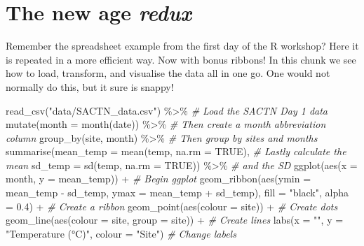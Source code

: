 \documentclass[
]{book}
\newenvironment{Shaded}{\begin{snugshade}}{\end{snugshade}}
\newcommand{\AttributeTok}[1]{\textcolor[rgb]{0.77,0.63,0.00}{#1}}
\newcommand{\CommentTok}[1]{\textcolor[rgb]{0.56,0.35,0.01}{\textit{#1}}}
\newcommand{\ConstantTok}[1]{\textcolor[rgb]{0.00,0.00,0.00}{#1}}
\newcommand{\FloatTok}[1]{\textcolor[rgb]{0.00,0.00,0.81}{#1}}
\newcommand{\FunctionTok}[1]{\textcolor[rgb]{0.00,0.00,0.00}{#1}}
\newcommand{\NormalTok}[1]{#1}
\newcommand{\SpecialCharTok}[1]{\textcolor[rgb]{0.00,0.00,0.00}{#1}}
\newcommand{\StringTok}[1]{\textcolor[rgb]{0.31,0.60,0.02}{#1}}
\begin{document}
\hypertarget{the-new-age-redux}{%
\section{\texorpdfstring{The new age \emph{redux}}{The new age redux}}\label{the-new-age-redux}}

Remember the spreadsheet example from the first day of the R workshop? Here it is repeated in a more efficient way. Now with bonus ribbons! In this chunk we see how to load, transform, and visualise the data all in one go. One would not normally do this, but it sure is snappy!

\begin{Shaded}
\begin{Highlighting}[]
\FunctionTok{read\_csv}\NormalTok{(}\StringTok{"data/SACTN\_data.csv"}\NormalTok{) }\SpecialCharTok{\%\textgreater{}\%} \CommentTok{\# Load the SACTN Day 1 data}
  \FunctionTok{mutate}\NormalTok{(}\AttributeTok{month =} \FunctionTok{month}\NormalTok{(date)) }\SpecialCharTok{\%\textgreater{}\%} \CommentTok{\# Then create a month abbreviation column}
  \FunctionTok{group\_by}\NormalTok{(site, month) }\SpecialCharTok{\%\textgreater{}\%} \CommentTok{\# Then group by sites and months}
  \FunctionTok{summarise}\NormalTok{(}\AttributeTok{mean\_temp =} \FunctionTok{mean}\NormalTok{(temp, }\AttributeTok{na.rm =} \ConstantTok{TRUE}\NormalTok{), }\CommentTok{\# Lastly calculate the mean}
            \AttributeTok{sd\_temp =} \FunctionTok{sd}\NormalTok{(temp, }\AttributeTok{na.rm =} \ConstantTok{TRUE}\NormalTok{)) }\SpecialCharTok{\%\textgreater{}\%} \CommentTok{\# and the SD}
  \FunctionTok{ggplot}\NormalTok{(}\FunctionTok{aes}\NormalTok{(}\AttributeTok{x =}\NormalTok{ month, }\AttributeTok{y =}\NormalTok{ mean\_temp)) }\SpecialCharTok{+} \CommentTok{\# Begin ggplot}
  \FunctionTok{geom\_ribbon}\NormalTok{(}\FunctionTok{aes}\NormalTok{(}\AttributeTok{ymin =}\NormalTok{ mean\_temp }\SpecialCharTok{{-}}\NormalTok{ sd\_temp, }\AttributeTok{ymax =}\NormalTok{ mean\_temp }\SpecialCharTok{+}\NormalTok{ sd\_temp), }
              \AttributeTok{fill =} \StringTok{"black"}\NormalTok{, }\AttributeTok{alpha =} \FloatTok{0.4}\NormalTok{) }\SpecialCharTok{+} \CommentTok{\# Create a ribbon}
  \FunctionTok{geom\_point}\NormalTok{(}\FunctionTok{aes}\NormalTok{(}\AttributeTok{colour =}\NormalTok{ site)) }\SpecialCharTok{+} \CommentTok{\# Create dots}
  \FunctionTok{geom\_line}\NormalTok{(}\FunctionTok{aes}\NormalTok{(}\AttributeTok{colour =}\NormalTok{ site, }\AttributeTok{group =}\NormalTok{ site)) }\SpecialCharTok{+} \CommentTok{\# Create lines}
  \FunctionTok{labs}\NormalTok{(}\AttributeTok{x =} \StringTok{""}\NormalTok{, }\AttributeTok{y =} \StringTok{"Temperature (°C)"}\NormalTok{, }\AttributeTok{colour =} \StringTok{"Site"}\NormalTok{) }\CommentTok{\# Change labels}
\end{Highlighting}
\end{Shaded}
\end{document}
